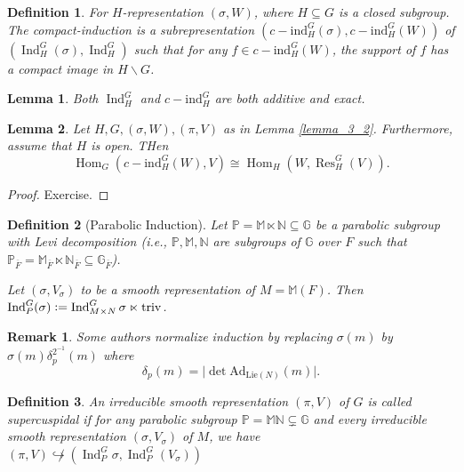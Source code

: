 \documentclass[10pt]{article}
\newtheorem{definition}{Definition}[section]
\newtheorem{lemma}{Lemma}[section]
\newtheorem{remark}{Remark}[section]
\numberwithin{equation}{theorem}
\DeclareMathOperator{\triv}{triv}
\DeclareMathOperator{\Ind}{Ind}
\DeclareMathOperator{\Hom}{Hom}
\DeclareMathOperator{\Res}{Res}
\newcommand{\defeq}{\vcentcolon=}
\newcommand{\bN}[0]{\mathbb{N}}
\newcommand{\G}[0]{\mathbb{G}}
\newcommand{\bP}[0]{\mathbb{P}}
\newcommand{\Lie}[0]{\mathrm{Lie}}
\begin{document}
\begin{definition}
    \label{definition_3_6}
    For $H$-representation $(\sigma,W)$, where $H\subseteq G$ is a closed subgroup. The compact-induction is a subrepresentation $(c-\mathrm{ind}_H^G(\sigma),c-\mathrm{ind}_H^G(W))$ of $(\Ind_H^G(\sigma),\Ind_H^G)$ such that for any $f\in c-\mathrm{ind}_H^G(W)$, the support of $f$ has a compact image in $H\backslash G$.
\end{definition}

\begin{lemma}
    \label{lemma_3_3}
    Both $\Ind_H^G$ and $c-\mathrm{ind}_H^G$ are both additive and exact.
\end{lemma}

\begin{lemma}
    \label{lemma_3_4}
    Let $H,G,(\sigma,W),(\pi,V)$ as in Lemma \ref{lemma_3_2}. Furthermore, assume that $H$ is open. THen 
    \begin{equation*}
        \Hom_G(c-\mathrm{ind}_H^G(W),V)\cong \Hom_H(W,\Res_H^G(V)).
    \end{equation*}
\end{lemma}

\begin{proof}
    Exercise.
\end{proof}

\begin{definition}[Parabolic Induction]
    \label{definition_3_7}
    Let $\bP=\mathbb{M}\ltimes \bN\subseteq\mathbb{G}$ be a parabolic subgroup with Levi decomposition (i.e., $\mathbb{P},\mathbb{M},\mathbb{N}$ are subgroups of $\mathbb{G}$ over $F$ such that $\mathbb{P}_{\overline{F}}=\mathbb{M}_{\overline{F}}\ltimes \mathbb{N}_{\overline{F}}\subseteq \mathbb{G}_{\overline{F}}$).
    \par Let $(\sigma,V_\sigma)$ to be a smooth representation of $M=\mathbb{M}(F)$. Then $\Ind_P^G(\sigma)\defeq \Ind_{M\times N}^G\sigma\ltimes\triv$.
\end{definition}

\begin{remark}
    Some authors normalize induction by replacing $\sigma(m)$ by $\sigma(m)\delta_p^{2^{-1}}(m)$ where 
    \begin{equation*}
        \delta_p(m) = \vert\det\mathrm{Ad}_{\Lie(N)}(m)\vert.
    \end{equation*}
\end{remark}

\begin{definition}
    \label{definition_3_8}
    An irreducible smooth representation $(\pi,V)$ of $G$ is called supercuspidal if for any parabolic subgroup $\bP=\mathbb{M}\bN\subsetneq \G$ and every irreducible smooth representation $(\sigma,V_\sigma)$ of $M$, we have $(\pi,V)\not\hookrightarrow (\Ind_P^G\sigma,\Ind_P^G(V_\sigma)) $
\end{definition}
\end{document}
